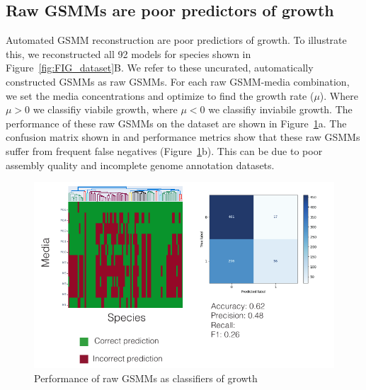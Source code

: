 \documentclass[11pt,a4paper]{article}
\begin{document}
\subsection*{Raw GSMMs are poor predictors of growth}
Automated GSMM reconstruction are poor predictiors of growth. To illustrate this, we reconstructed all 92 models for species shown in Figure~\ref{fig:FIG_dataset}B. We refer to these uncurated, automatically constructed GSMMs as raw GSMMs. For each raw GSMM-media combination, we set the media concentrations and optimize to find the growth rate ($\mu$). Where $\mu > 0$ we classifiy viabile growth, where $\mu < 0$ we classifiy inviabile growth. The performance of these raw GSMMs on the dataset are shown in Figure~\ref{fig:FIG_raw_GSMM_performance}a. The confusion matrix shown in and performance metrics show that these raw GSMMs suffer from frequent false negatives (Figure~\ref{fig:FIG_raw_GSMM_performance}b). This can be due to poor assembly quality and incomplete genome annotation datasets. 
\begin{figure}[tbp]
    \includegraphics[width=\textwidth]{figures/FIG_mel_raw_GSMM_classifier/FIG_raw_GSMM_performance.pdf}
    \caption{Performance of raw GSMMs as classifiers of growth}
    \label{fig:FIG_raw_GSMM_performance}
 \end{figure}
\end{document}

